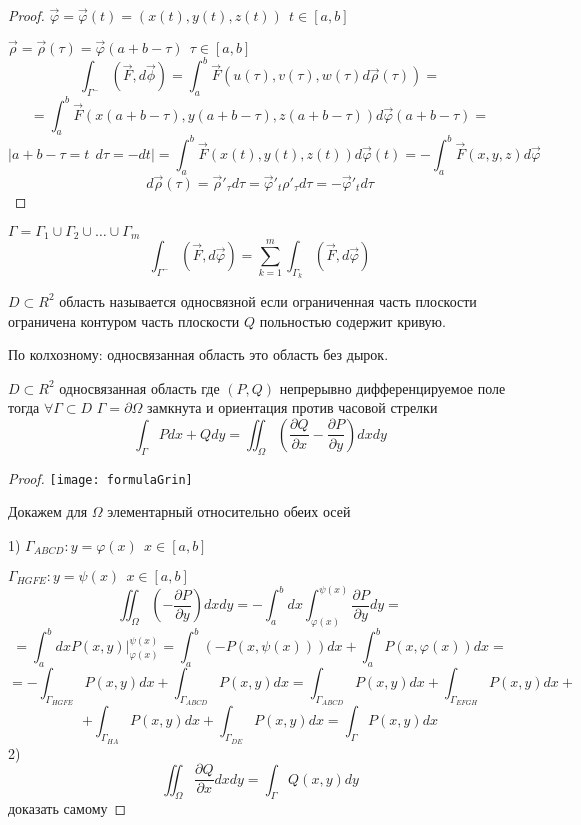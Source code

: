 \begin{proof}
  $\vec \varphi = \vec \varphi(t) = (x(t), y(t), z(t)) ~~ t \in [a,b]$

  $\vec \rho = \vec \rho (\tau) = \vec \varphi(a+b-\tau) ~~ \tau \in [a,b]$
  $$
  \int_{\Gamma^-}(\vec F, d\vec \phi) = \int_a^b \vec F(u(\tau), v(\tau),
  w(\tau)d\vec \rho (\tau)) =
  $$
  $$
  = \int_a^b \vec F(x(a+b-\tau),y(a+b-\tau),z(a+b-\tau))d\vec \varphi(a+b-\tau)
  =
  $$
  $$
  |a+b -\tau = t ~~ d\tau = -dt|
  = \int_a^b \vec F(x(t), y(t), z(t))d\vec \varphi(t) =
  - \int_a^b \vec F(x,y,z)d\vec\varphi
  $$
  $$
  d\vec \rho(\tau) = \vec \rho'_{\tau} d\tau = \vec \varphi'_t \rho'_{\tau}
  d\tau = -\vec \varphi'_t d\tau
  $$
\end{proof}

\begin{theorem}
  $\Gamma = \Gamma_1 \cup \Gamma_2 \cup \ldots \cup \Gamma_m$
  $$
  \int_{\Gamma^-} (\vec F, d\vec \varphi) = \sum_{k=1}^m \int_{\Gamma_k}
  (\vec F, d\vec \varphi)
  $$
\end{theorem}

\begin{define}
  $D \subset R^2$ область называется односвязной если ограниченная часть
  плоскости ограничена контуром часть плоскости $Q$ польностью содержит кривую.

  По колхозному: односвязанная область это область без дырок.
\end{define}

\begin{block}
  $D \subset R^2$ односвязанная область где $(P,Q)$ непрерывно дифференцируемое
  поле тогда $\forall \Gamma \subset D$ $\Gamma = \partial \Omega$ замкнута и
  ориентация против часовой стрелки
  $$
  \int_{\Gamma} Pdx + Qdy = \iint_{\Omega}  \left( \frac{\partial Q}{\partial x}
  - \frac{\partial P}{\partial y} \right) dxdy
  $$
\end{block}

\begin{proof}
  \texttt{[image: formulaGrin]}

  Докажем для $\Omega$ элементарный относительно обеих осей

  1)
  $\Gamma_{ABCD}: y = \varphi(x) ~~ x \in [a,b]$

  $\Gamma_{HGFE}: y = \psi(x) ~~ x \in [a,b]$
  $$
  \iint_{\Omega} \left( -\frac{\partial P}{\partial y} \right) dx dy =
  -\int_a^b dx \int_{\varphi(x)}^{\psi(x)} \frac{\partial P}{\partial y} dy =
  $$
  $$
  = \int_a^b dx P(x,y) |_{\varphi(x)}^{\psi(x)} = \int_a^b(-P(x, \psi(x)))dx +
  \int_a^b P(x, \varphi(x)) dx =
  $$
  $$
  = -\int_{\Gamma_{HGFE}} P(x, y) dx + \int_{\Gamma_{ABCD}} P(x,y)dx =
  \int_{\Gamma_{ABCD}} P(x,y)dx + \int_{\Gamma_{EFGH}} P(x,y)dx +
  $$
  $$
  + \int_{\Gamma_{HA}} P(x, y)dx + \int_{\Gamma_{DE}} P(x,y) dx =
  \int_{\Gamma} P(x,y) dx
  $$
  2)
  $$
  \iint_{\Omega} \frac{\partial Q}{\partial x} dx dy = \int_{\Gamma} Q(x,y)dy
  $$
  доказать самому
\end{proof}

